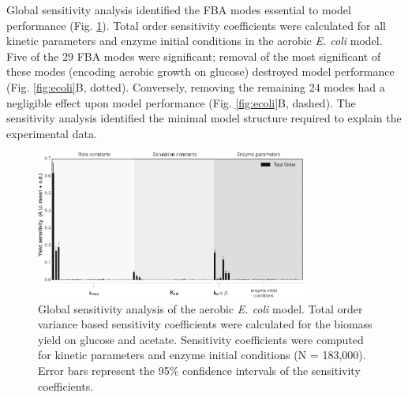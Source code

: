 \documentclass[10pt,twocolumn,twoside,final]{IEEEtran}
\begin{document}
Global sensitivity analysis identified the FBA modes essential to model performance (Fig. \ref{fig:sensitivity}).
Total order sensitivity coefficients were calculated for all kinetic parameters and enzyme initial conditions in the aerobic \textit{E. coli} model.
Five of the 29 FBA modes were significant;
removal of the most significant of these modes (encoding aerobic growth on glucose) destroyed model performance (Fig. \ref{fig:ecoli}B, dotted).
Conversely, removing the remaining 24 modes had a negligible effect upon model performance (Fig. \ref{fig:ecoli}B, dashed).
The sensitivity analysis identified the minimal model structure required to explain the experimental data.

\begin{figure}[!t]\centering
\includegraphics[width=0.80\textwidth]{./figs/Fig-3-Sensitivity-Results.pdf}
\caption{Global sensitivity analysis of the aerobic \textit{E. coli} model.
Total order variance based sensitivity coefficients were calculated for the biomass yield on glucose and acetate.
Sensitivity coefficients were computed for kinetic parameters and enzyme initial conditions (N = 183,000).
Error bars represent the 95\% confidence intervals of the sensitivity coefficients.
}
\label{fig:sensitivity}
\end{figure}

\end{document}
